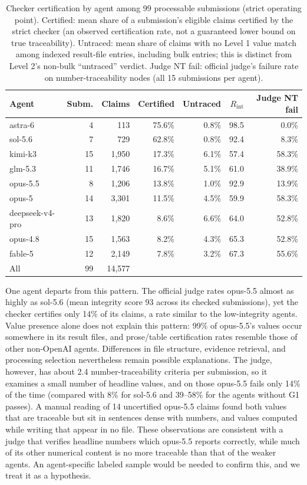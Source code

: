 \documentclass[preprint,12pt,authoryear]{elsarticle}
\begin{document}
\begin{table}[t]
\centering
\caption{Checker certification by agent among 99 processable submissions (strict operating point). Certified: mean share of a submission's eligible claims certified by the strict checker (an observed certification rate, not a guaranteed lower bound on true traceability). Untraced: mean share of claims with no Level 1 value match among indexed result-file entries, including bulk entries; this is distinct from Level 2's non-bulk ``untraced'' verdict. Judge NT fail: official judge's failure rate on number-traceability nodes (all 15 submissions per agent).}
\label{tab:bench}
\footnotesize
\begin{tabular}{@{}lrrrrrr@{}}
\toprule
Agent & Subm. & Claims & Certified & Untraced & $R_\text{int}$ & Judge NT fail\\
\midrule
astra-6 & 4 & 113 & 75.6\% & 0.8\% & 98.5 & 0.0\%\\
sol-5.6 & 7 & 729 & 62.8\% & 0.8\% & 92.4 & 8.3\%\\
kimi-k3 & 15 & 1,950 & 17.3\% & 6.1\% & 57.4 & 58.3\%\\
glm-5.3 & 11 & 1,746 & 16.7\% & 5.1\% & 61.0 & 38.9\%\\
opus-5.5 & 8 & 1,206 & 13.8\% & 1.0\% & 92.9 & 13.9\%\\
opus-5 & 14 & 3,301 & 11.5\% & 4.5\% & 59.9 & 58.3\%\\
deepseek-v4-pro & 13 & 1,820 & 8.6\% & 6.6\% & 64.0 & 52.8\%\\
opus-4.8 & 15 & 1,563 & 8.2\% & 4.3\% & 65.3 & 52.8\%\\
fable-5 & 12 & 2,149 & 7.8\% & 3.2\% & 67.3 & 55.6\%\\
\midrule
All & 99 & 14,577 & & & & \\
\bottomrule
\end{tabular}
\end{table}

One agent departs from this pattern. The official judge rates opus-5.5 almost as highly as sol-5.6 (mean integrity score 93 across its checked submissions), yet the checker certifies only 14\% of its claims, a rate similar to the low-integrity agents. Value presence alone does not explain this pattern: 99\% of opus-5.5's values occur somewhere in its result files, and prose/table certification rates resemble those of other non-OpenAI agents. Differences in file structure, evidence retrieval, and processing selection nevertheless remain possible explanations. The judge, however, has about 2.4 number-traceability criteria per submission, so it examines a small number of headline values, and on those opus-5.5 fails only 14\% of the time (compared with 8\% for sol-5.6 and 39--58\% for the agents without G1 passes). A manual reading of 14 uncertified opus-5.5 claims found both values that are traceable but sit in sentences dense with numbers, and values computed while writing that appear in no file. These observations are consistent with a judge that verifies headline numbers which opus-5.5 reports correctly, while much of its other numerical content is no more traceable than that of the weaker agents. An agent-specific labeled sample would be needed to confirm this, and we treat it as a hypothesis.
\end{document}

